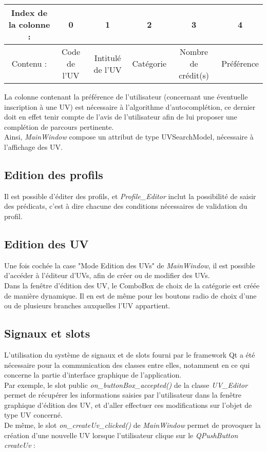 \documentclass[a4paper,10pt,french]{report}
\begin{document}
	\begin{tabular}{|c||c|c|c|c|c|}
	\hline
	Index de la colonne :  & 0 & 1 & 2 & 3 & 4 \\ \hline
	Contenu : & Code de l'UV & Intitulé de l'UV & Catégorie & Nombre de crédit(s) & Préférence \\
	\hline
	\end{tabular}
	
	La colonne contenant la préférence de l'utilisateur (concernant une éventuelle inscription à une UV) est nécessaire à l'algorithme d'autocomplétion, ce dernier doit en effet tenir compte de l'avis de l'utilisateur afin de lui proposer une complétion de parcours pertinente.\\
    
    Ainsi, \emph{MainWindow} compose un attribut de type UVSearchModel, nécessaire à l'affichage des UV. %
    
    
	
	
		
	
    \subsection{Edition des profils}\label{subsec:Edition des profils}
        Il est possible d'éditer des profils, et \emph{Profile\_Editor} inclut la possibilité de saisir des prédicats, c'est à dire chacune des conditions nécessaires de validation du profil.
        
        
	\subsection{Edition des UV}\label{subsec:Edition des UV}
    
		Une fois cochée la case "Mode Edition des UVs" de \emph{MainWindow}, il est possible d'accéder à l'éditeur d'UVs, afin de créer ou de modifier des UVs.\\
		Dans la fenêtre d'édition des UV, le ComboBox de choix de la catégorie est créée de manière dynamique.
		Il en est de même pour les boutons radio de choix d'une ou de plusieurs branches auxquelles l'UV appartient.
        

    \subsection{Signaux et slots}\label{subsec:signaux et slots}
		L'utilisation du système de signaux et de slots fourni par le framework Qt a été nécessaire pour la communication des classes entre elles, notamment en ce qui concerne la partie d'interface graphique de l'application.\\
        Par exemple, le slot public \emph{on\_buttonBox\_accepted()} de la classe \emph{UV\_Editor} permet de récupérer les informations saisies par l'utilisateur dans la fenêtre graphique d'édition des UV, et d'aller effectuer ces modifications sur l'objet de type UV concerné.\\
        De même, le slot \emph{on\_createUv\_clicked()} de \emph{MainWindow} permet de provoquer la création d'une nouvelle UV lorsque l'utilisateur clique sur le \emph{QPushButton} \emph{createUv} : 
        
\end{document}
